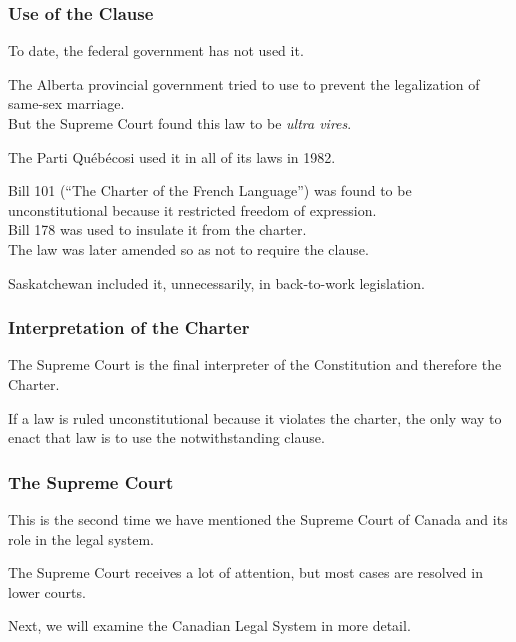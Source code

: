 \begin{frame}
\frametitle{Use of the Clause}

To date, the federal government has not used it.

The Alberta provincial government tried to use to prevent the legalization of same-sex marriage.\\
\quad But the Supreme Court found this law to be \textit{ultra vires}.

The Parti Qu\'eb\'ecosi used it in all of its laws in 1982.

Bill 101 (``The Charter of the French Language'') was found to be unconstitutional because it restricted freedom of expression.\\
\quad Bill 178 was used to insulate it from the charter.\\
\quad The law was later amended so as not to require the clause.

Saskatchewan included it, unnecessarily, in back-to-work legislation.

\end{frame}



\begin{frame}
\frametitle{Interpretation of the Charter}

The Supreme Court is the final interpreter of the Constitution and therefore the Charter.

If a law is ruled unconstitutional because it violates the charter, the only way to enact that law is to use the notwithstanding clause.


\end{frame}



\begin{frame}
\frametitle{The Supreme Court}

This is the second time we have mentioned the Supreme Court of Canada and its role in the legal system.

The Supreme Court receives a lot of attention, but most cases are resolved in lower courts.

Next, we will examine the Canadian Legal System in more detail.

\end{frame}




